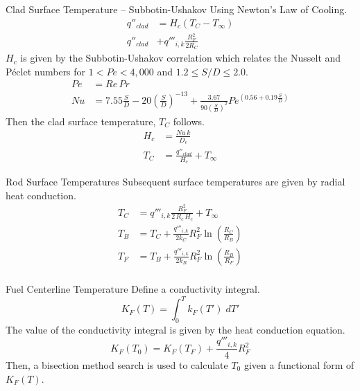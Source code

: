 \begin{frame}{Clad Surface Temperature -- Subbotin-Ushakov}
  Using Newton's Law of Cooling.
  \begin{align}
    q''_{clad} &= H_c (T_C - T_{\infty}) \\
    q''_{clad} &+ q'''_{i,k} \frac{R_F^2}{2 R_C}
  \end{align}
  $H_c$ is given by the Subbotin-Ushakov correlation \cite{subbotinUshakov}
  which relates the Nusselt and P\'eclet numbers for ${1 < Pe < 4,000}$ and 
  ${ 1.2 \le S/D \le 2.0 }$.
  \begin{align}
    Pe &= Re \, Pr \\
    \label{eq:subbotinUshakov}
    Nu &= 7.55 \frac{S}{D} - 20 \left(\frac{S}{D}\right)^{-13} + 
      \frac{3.67}{90\left(\frac{S}{D}\right)^{2}}
      Pe^{\left(0.56 + 0.19 \frac{S}{D}\right)}
  \end{align}
  Then the clad surface temperature, $T_C$ follows.
  \begin{align}
    H_c &= \frac{N\!u \, k}{D_e} \\
    T_C &= \frac{q''_{clad}}{H_c} + T_{\infty}
  \end{align}
\end{frame}

\begin{frame}{Rod Surface Temperatures}
  Subsequent surface temperatures are given by radial heat conduction.
  \begin{align}
    \label{eq:tc_forward}
    T_C &= q'''_{i,k} \frac{R_F^2}{2\,R_c\,H_c} + T_{\infty} \\
    \label{eq:tb_forward}
    T_B &= T_C + \frac{q'''_{i,k}}{2 k_C} R_F^2
      \ln\left(\frac{R_C}{R_B}\right) \\
    \label{eq:tf_forward}
    T_F &= T_B + \frac{q'''_{i,k}}{2 k_B} R_F^2 
      \ln\left(\frac{R_B}{R_F}\right) \\
  \end{align}
\end{frame}

\begin{frame}{Fuel Centerline Temperature}
  Define a conductivity integral.
  \begin{equation}
    \label{eq:conductivity_integral}
    K_F(T) = \int_0^T k_F(T') \; dT'
  \end{equation}
  The value of the conductivity integral is given by the heat conduction
  equation.
  \begin{equation}
    \label{eq:tcl_conductivity_integral}
    K_F(T_0) = K_F(T_F) + \frac{q'''_{i,k}}{4} R_F^2
  \end{equation}
  Then, a bisection method search is used to calculate $T_0$ given a functional
  form of $K_F(T)$.
\end{frame}

